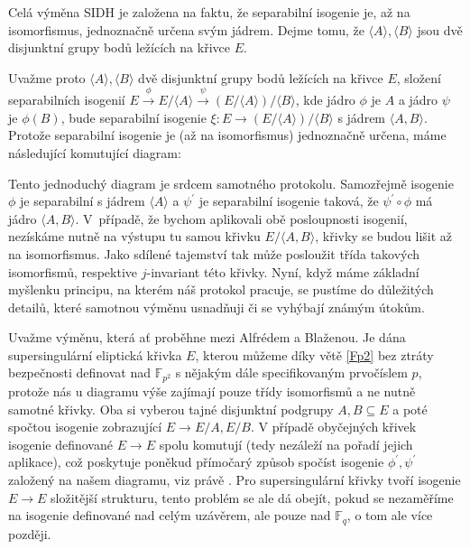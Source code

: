 \documentclass[12pt]{report}
\begin{document}
Celá výměna SIDH je založena na faktu, že separabilní isogenie je, až na isomorfismus, jednoznačně určena svým jádrem. Dejme tomu, že $\langle A \rangle, \langle B \rangle$ jsou dvě disjunktní grupy bodů ležících na křivce $E$.

 Uvažme proto $\langle A \rangle,\langle B \rangle$ dvě disjunktní grupy bodů ležících na křivce $E$, složení separabilních isogenií $E \stackrel{\phi}{\longrightarrow} E/\langle A \rangle \stackrel{\psi}{\longrightarrow} (E / \langle A \rangle)/\langle B \rangle$, kde jádro $\phi$ je $A$ a jádro $\psi$ je $\phi (B)$, bude separabilní isogenie $\xi : E \longrightarrow (E / \langle A \rangle)/\langle B \rangle$ s jádrem $\langle A,B \rangle$. Protože separabilní isogenie je (až na isomorfismus) jednoznačně určena, máme následující komutující diagram:

\begin{figure}[h]
\begin{center} 
\end{center}
\end{figure}

Tento jednoduchý diagram je srdcem samotného protokolu. Samozřejmě isogenie $\phi$ je separabilní s jádrem $\langle A \rangle$ a $\psi^\prime$ je separabilní isogenie taková, že $\psi^\prime \circ \phi$ má jádro $\langle A,B \rangle$. V~případě, že bychom aplikovali obě posloupnosti isogenií, nezískáme nutně na výstupu tu samou křivku $E/\langle A,B \rangle$, křivky se budou lišit až na isomorfismus. Jako sdílené tajemství tak může posloužit třída takových isomorfismů, respektive $j$-invariant této křivky. Nyní, když máme základní myšlenku principu, na kterém náš protokol pracuje, se pustíme do důležitých detailů, které samotnou výměnu usnadňuji či se vyhýbají známým útokům.

Uvažme výměnu, která ať proběhne mezi Alfrédem a Blaženou. Je dána supersingulární eliptická křivka $E$, kterou můžeme díky větě \ref{Fp2} bez ztráty bezpečnosti definovat nad $\mathbb{F}_{p^2}$ s nějakým dále specifikovaným prvočíslem $p$, protože nás u diagramu výše zajímají pouze třídy isomorfismů a ne nutně samotné křivky. Oba si vyberou tajné disjunktní podgrupy $A,B \subseteq E$ a poté spočtou isogenie zobrazující $E \longrightarrow E/A,E/B$. V případě obyčejných křivek isogenie definované $E \longrightarrow E$ spolu komutují (tedy nezáleží na pořadí jejich aplikace), což poskytuje poněkud přímočarý způsob spočíst isogenie $\phi^\prime,\psi^\prime$ založený na našem diagramu, viz právě \cite{Stolbunov}. Pro supersingulární křivky tvoří isogenie $E \longrightarrow E$ složitější strukturu, tento problém se ale dá obejít, pokud se nezaměříme na isogenie definované nad celým uzávěrem, ale pouze nad $\mathbb{F}_q$, o tom ale více později. 
\end{document}
